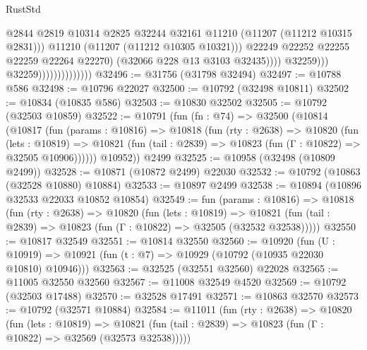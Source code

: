 \begin{lexlean}{RustStd}
\begin{coremodule}
                                                  @2844
                                                  @2819
                                                  @10314
                                                  @2825
                                                  @32244
                                                  @32161
                                                  @11210
                                                  (@11207 (@11212 @10315 @2831)))
                                                @11210
                                                (@11207 (@11212 @10305 @10321)))
                                              @22249
                                              @22252
                                              @22255
                                              @22259
                                              @22264
                                              @22270)
                                            (@32066 @228 @13 @3103 @32435))))
                                      @32259)))
                                @32259))))))))))))))
@32496 := @31756 (@31798 @32494)
@32497 := @10788 @586
@32498 := @10796 @22027
@32500 := @10792 (@32498 @10811)
@32502 := @10834 (@10835 @586)
@32503 := @10830 @32502
@32505 := @10792 (@32503 @10859)
@32522 := @10791
    (fun (fn : @74) =>
    @32500
      (@10814
        (@10817
          (fun (params : @10816) =>
          @10818
            (fun (rty : @2638) =>
            @10820
              (fun (lets : @10819) =>
              @10821 (fun (tail : @2839) => @10823 (fun (Γ : @10822) => @32505 @10906))))))
        @10952))
    @2499
@32525 := @10958 (@32498 (@10809 @2499))
@32528 := @10871 (@10872 @2499) @22030
@32532 := @10792 (@10863 (@32528 @10880) @10884)
@32533 := @10897 @2499
@32538 := @10894 (@10896 @32533 @22033 @10852 @10854)
@32549 := fun (params : @10816) =>
  @10818
    (fun (rty : @2638) =>
    @10820
      (fun (lets : @10819) =>
      @10821 (fun (tail : @2839) => @10823 (fun (Γ : @10822) => @32505 (@32532 @32538)))))
@32550 := @10817 @32549
@32551 := @10814 @32550
@32560 := @10920
    (fun (U : @10919) => @10921 (fun (t : @7) => @10929 (@10792 (@10935 @22030 @10810) @10946)))
@32563 := @32525 (@32551 @32560) @22028
@32565 := @11005 @32550 @32560
@32567 := @11008 @32549 @4520
@32569 := @10792 (@32503 @17488)
@32570 := @32528 @17491
@32571 := @10863 @32570
@32573 := @10792 (@32571 @10884)
@32584 := @11011
    (fun (rty : @2638) =>
    @10820
      (fun (lets : @10819) =>
      @10821 (fun (tail : @2839) => @10823 (fun (Γ : @10822) => @32569 (@32573 @32538)))))

\end{coremodule}
\end{lexlean}
